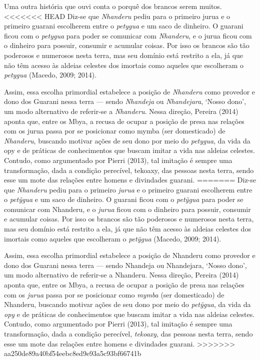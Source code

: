 {{Uma outra história que ouvi conta o porquê dos brancos serem muitos.
<<<<<<< HEAD
Diz-se que \emph{Nhanderu} pediu para o primeiro jurua e o primeiro guarani
escolherem entre o \emph{petygua} e um saco de dinheiro. O guarani ficou
com o \emph{petygua} para poder se comunicar com \emph{Nhanderu}, e o jurua ficou
com o dinheiro para possuir, consumir e acumular coisas. Por isso os
brancos são tão poderosos e numerosos nesta terra, mas seu domínio está
restrito a ela, já que não têm acesso às aldeias celestes dos imortais
como aqueles que escolheram o \emph{petygua} (Macedo, 2009; 2014). 

Assim, essa escolha primordial estabelece a posição de \emph{Nhanderu} como
provedor e dono dos Guarani nessa terra --- sendo \emph{Nhandeja} ou \emph{Nhandejara},
‘Nosso dono’, um modo alternativo de referir-se a \emph{Nhanderu}. Nessa
direção, Pereira (2014) aponta que, entre os Mbya, a recusa de ocupar a
posição de presa nas relações com os jurua passa por se posicionar como
mymba (ser domesticado) de \emph{Nhanderu}, buscando motivar ações de seu dono
por meio do \emph{petygua}, da vida da opy e de práticas de conhecimentos
que buscam imitar a vida nas aldeias celestes. Contudo, como
argumentado por Pierri (2013), tal imitação é sempre uma transformação,
dada a condição perecível, tekoaxy, das pessoas nesta terra, sendo esse
um mote das relações entre homens e divindades guarani.
=======
Diz-se que \emph{Nhanderu} pediu para o primeiro \emph{jurua} e o primeiro guarani
escolherem entre o \emph{pet\~{y}gua} e um saco de dinheiro. O guarani ficou
com o \emph{pet\~{y}gua} para poder se comunicar com Nhanderu, e o \emph{jurua} ficou
com o dinheiro para possuir, consumir e acumular coisas. Por isso os
brancos são tão poderosos e numerosos nesta terra, mas seu domínio está
restrito a ela, já que não têm acesso às aldeias celestes dos imortais
como aqueles que escolheram o \emph{pet\~{y}gua} (Macedo, 2009; 2014). 

Assim, essa escolha primordial estabelece a posição de Nhanderu como
provedor e dono dos Guarani nessa terra --- sendo Nhandeja ou
Nhandejara, `Nosso dono', um modo alternativo de referir-se a Nhanderu.
Nessa direção, Pereira (2014) aponta que, entre os Mbya, a recusa de
ocupar a posição de presa nas relações com os \emph{jurua} passa por se
posicionar como \emph{mymba} (ser domesticado) de Nhanderu, buscando
motivar ações de seu dono por meio do \emph{petỹgua}, da vida da
\emph{opy} e de práticas de conhecimentos que buscam imitar a vida nas
aldeias celestes. Contudo, como argumentado por Pierri (2013), tal
imitação é sempre uma transformação, dada a condição perecível,
\emph{tekoaxy}, das pessoas nesta terra, sendo esse um mote das relações
entre homens e divindades guarani.
>>>>>>> aa250de89a40bf54eebc8ed9e93a5c93bf66741b

}}
